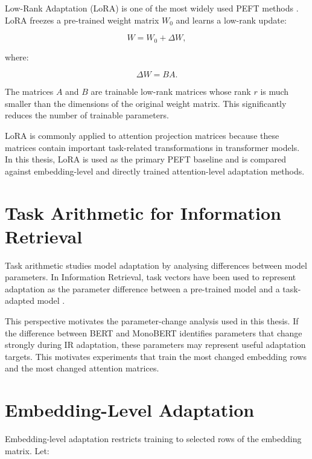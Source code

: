 Low-Rank Adaptation (LoRA) is one of the most widely used PEFT methods \cite{hu2021lora}. LoRA freezes a pre-trained weight matrix $W_0$ and learns a low-rank update:

\begin{equation}
    W = W_0 + \Delta W,
\end{equation}

where:

\begin{equation}
    \Delta W = BA.
\end{equation}

The matrices $A$ and $B$ are trainable low-rank matrices whose rank $r$ is much smaller than the dimensions of the original weight matrix. This significantly reduces the number of trainable parameters.

LoRA is commonly applied to attention projection matrices because these matrices contain important task-related transformations in transformer models. In this thesis, LoRA is used as the primary PEFT baseline and is compared against embedding-level and directly trained attention-level adaptation methods.


\section{Task Arithmetic for Information Retrieval}
\label{sec:background_task_arithmetic}

Task arithmetic studies model adaptation by analysing differences between model parameters. In Information Retrieval, task vectors have been used to represent adaptation as the parameter difference between a pre-trained model and a task-adapted model \cite{braga2025taskarithmetic}.

This perspective motivates the parameter-change analysis used in this thesis. If the difference between BERT and MonoBERT identifies parameters that change strongly during IR adaptation, these parameters may represent useful adaptation targets. This motivates experiments that train the most changed embedding rows and the most changed attention matrices.

\section{Embedding-Level Adaptation}
\label{sec:background_embedding_adaptation}

Embedding-level adaptation restricts training to selected rows of the embedding matrix. Let:

